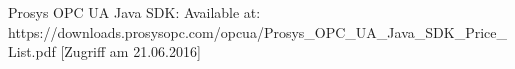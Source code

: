 \documentclass[12pt]{article} %
\begin{document}
	
	
	
	
	

\newpage
\renewcommand\refname{Literaturverzeichnis}
\begin{thebibliography}{99} %
	\raggedright
	
	Prosys OPC UA Java SDK:
	\newblock [online] Available at: https://downloads.prosysopc.com/opcua/Prosys\_OPC\_UA\_Java\_SDK\_Price\_List.pdf [Zugriff am 21.06.2016]

\end{thebibliography}

	
\end{document}
